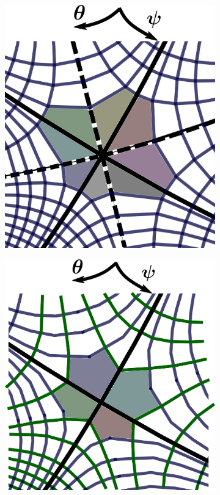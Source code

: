 \begin{figure}[H]
	\centering
	\begin{subfigure}[t]{0.39\textwidth}
		\centering
		\includegraphics[width=1\textwidth]{schemes/XpointCentered.png}
		\label{fig:CenteredXpoint}
	\end{subfigure}
	\begin{subfigure}[t]{0.39\textwidth}
		\centering
		\includegraphics[width=1\textwidth]{schemes/XpointStaggered.png}

\end{subfigure}
\end{figure}
